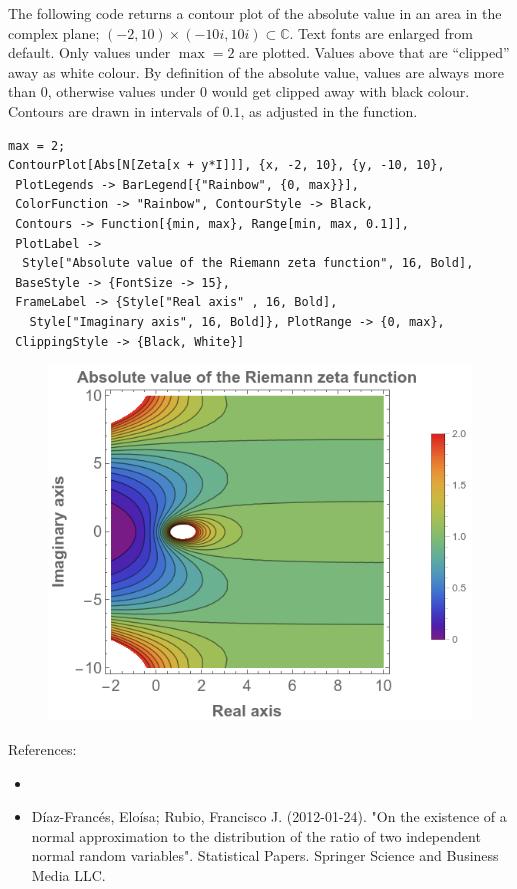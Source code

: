 \documentclass{article}
\begin{document}
The following code returns a contour plot of the  absolute value in an area in the complex plane; $(-2,10) \times(-10i, 10i) \subset \mathbb{C}.$ Text fonts are enlarged from default. Only values under $\max = 2$ are plotted. Values above that are ``clipped'' away as white colour. By definition of the absolute value, values are always more than $0$, otherwise values under $0$ would get clipped away with black colour. Contours are drawn in intervals of $0.1$, as adjusted in the  function.
\begin{verbatim}
max = 2;
ContourPlot[Abs[N[Zeta[x + y*I]]], {x, -2, 10}, {y, -10, 10}, 
 PlotLegends -> BarLegend[{"Rainbow", {0, max}}], 
 ColorFunction -> "Rainbow", ContourStyle -> Black, 
 Contours -> Function[{min, max}, Range[min, max, 0.1]], 
 PlotLabel -> 
  Style["Absolute value of the Riemann zeta function", 16, Bold], 
 BaseStyle -> {FontSize -> 15}, 
 FrameLabel -> {Style["Real axis" , 16, Bold], 
   Style["Imaginary axis", 16, Bold]}, PlotRange -> {0, max}, 
 ClippingStyle -> {Black, White}]
\end{verbatim}


\begin{figure}
  \includegraphics[width=\linewidth]{zeta.png}
\end{figure}



References:
\begin{itemize}
\item {}
\item Díaz-Francés, Eloísa; Rubio, Francisco J. (2012-01-24). "On the existence of a normal approximation to the distribution of the ratio of two independent normal random variables". Statistical Papers. Springer Science and Business Media LLC.
\end{itemize}
\end{document}
